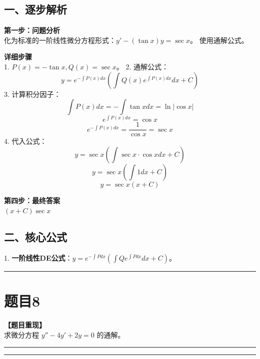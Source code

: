 \documentclass[12pt, a4paper]{ctexart}
\newcommand{\TopSeparator}{
    \par\noindent\rule{\textwidth}{1.5pt}\vspace{0.5em} %
}
\newcommand{\AnalysisSeparator}{
    \par\noindent\rule{\textwidth}{0.5pt}\vspace{0.2em}\hrule\vspace{0.5em} %
}
\newenvironment{RedAnalysis}{
    \par
    \color{red} %
}{
    \par
    \color{black} %
}
\begin{document}
\begin{RedAnalysis}

\subsection*{一、逐步解析}

\textbf{第一步：问题分析} \\
化为标准的一阶线性微分方程形式：$y' - (\tan x)y = \sec x$。
使用通解公式。

\textbf{详细步骤} \\
1. $P(x) = -\tan x, Q(x) = \sec x$。
2. 通解公式：
   \[ y = e^{-\int P(x)dx} (\int Q(x) e^{\int P(x)dx} dx + C) \]
3. 计算积分因子：
   \[ \int P(x) dx = - \int \tan x dx = \ln|\cos x| \]
   \[ e^{\int P(x)dx} = \cos x \]
   \[ e^{-\int P(x)dx} = \frac{1}{\cos x} = \sec x \]
4. 代入公式：
   \[ y = \sec x (\int \sec x \cdot \cos x dx + C) \]
   \[ y = \sec x (\int 1 dx + C) \]
   \[ y = \sec x (x + C) \]

\textbf{第四步：最终答案} \\
$ (x+C)\sec x $

\subsection*{二、核心公式}
1. \textbf{一阶线性DE公式}：$y = e^{-\int P dx}(\int Q e^{\int P dx} dx + C)$。

\end{RedAnalysis}

\vspace{2em}

\TopSeparator
\section*{题目8}

\textbf{【题目重现】} \\
求微分方程 $ y'' - 4y' + 2y = 0 $ 的通解。

\AnalysisSeparator
\end{document}

